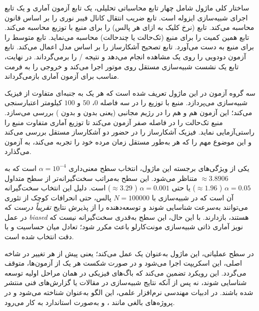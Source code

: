 ساختار کلی ماژول شامل چهار تابع محاسباتی تحلیلی، یک تابع آزمون آماری و یک تابع اجرای شبیه‌سازی ایزوله است. تابع  ضریب انتقال کانال فیبر نوری را بر اساس قانون  محاسبه می‌کند. تابع   (نرخ کلیک به ازای هر پالس) را برای منبع  با توزیع  محاسبه می‌کند. تابع  همین کمیت را برای منبع  (تک‌حالت یا چندحالت) محاسبه می‌نماید. تابع   متوسط را برای منبع  به دست می‌آورد. تابع  تصحیح  آشکارساز را بر اساس مدل  اعمال می‌کند. تابع  آزمون  دودویی را روی یک مشاهده انجام می‌دهد و نتیجه / را برمی‌گرداند. در نهایت، تابع  یک نشست شبیه‌سازی مستقل روی موتور  اجرا می‌کند و خروجی را به فرمت مناسب برای آزمون آماری بازمی‌گرداند.

سه گروه آزمون در این ماژول تعریف شده است که هر یک به جنبه‌ای متفاوت از فیزیک شبیه‌سازی می‌پردازد.  منبع  با توزیع  را در سه فاصله $0$، $50$ و $100$ کیلومتر اعتبارسنجی می‌کند؛ این آزمون هم  و هم  را در رژیم مجانبی (یعنی بدون  و بدون ) بررسی می‌سازد.  منبع  تک‌حالت را در فاصله صفر آزمون می‌کند تا توزیع آماری متفاوت منبع را راستی‌آزمایی نماید.  فیزیک  آشکارساز  را در حضور دو آشکارساز مستقل بررسی می‌کند و این موضوع مهم را که هر  به‌طور مستقل زمان مرده خود را تجربه می‌کند، به آزمون می‌گذارد.

یکی از ویژگی‌های برجسته این ماژول، انتخاب سطح معنی‌داری $\alpha = 10^{-4}$ است که به  $\approx 3.8906$ متناظر می‌شود. این سطح به‌مراتب سخت‌گیرانه‌تر از سطح متداول $\alpha = 0.05$ ( $\approx 1.96$) یا حتی $\alpha = 0.001$ ( $\approx 3.29$) است. دلیل این انتخاب سخت‌گیرانه آن است که در شبیه‌سازی  با $N = 100000$ پالس، حتی انحرافات کوچک از تئوری می‌توانند به‌سرعت شناسایی شوند و توسعه‌دهنده را از پذیرش نتایج \emph{تقریباً درست} که در عمل \emph{biased} هستند، بازدارند. با این حال، این سطح به‌قدری سخت‌گیرانه نیست که نویز آماری ذاتی شبیه‌سازی مونت‌کارلو باعث  مکرر شود؛ تعادل میان حساسیت و  با دقت انتخاب شده است.

در سطح عملیاتی، این ماژول به‌عنوان یک  عمل می‌کند؛ یعنی پیش از  هر تغییر در شاخه اصلی، این اسکریپت اجرا می‌شود و در صورت شکست هر یک از آزمون‌ها،  متوقف می‌گردد. این رویکرد  تضمین می‌کند که باگ‌های فیزیکی در همان مراحل اولیه توسعه شناسایی شوند، نه پس از آنکه نتایج شبیه‌سازی در مقالات یا گزارش‌های فنی منتشر شده باشند. در ادبیات مهندسی نرم‌افزار علمی، این الگو به‌عنوان  شناخته می‌شود و در پروژه‌های بالغی مانند ،  و  به‌صورت استاندارد به کار می‌رود.

